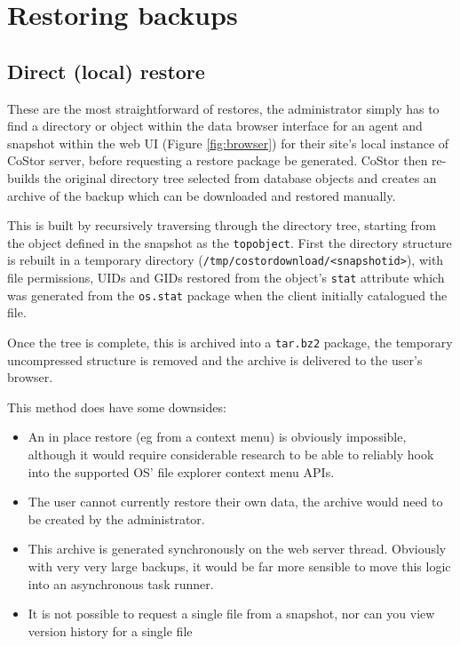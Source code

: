 \documentclass[bsc,frontabs,twoside,singlespacing,parskip,deptreport]{infthesis}     %
\begin{document}
\section{Restoring backups}
\label{sec:restoringbackups}

\subsection{Direct (local) restore}

These are the most straightforward of restores, the administrator simply has to find a directory
or object within the data browser interface  for an agent and snapshot within the web UI (Figure \ref{fig:browser}) for their 
site's local instance of CoStor server, before requesting a restore package be generated. CoStor 
then re-builds the original directory tree selected from database objects and creates an archive
of the backup which can be downloaded and restored manually.

This is built by recursively traversing through the directory tree, starting from the object defined in the 
snapshot as the \texttt{topobject}. First the directory structure is rebuilt in a temporary 
directory (\texttt{/tmp/costordownload/<snapshotid>}), with file permissions, UIDs and GIDs 
restored from the object's \texttt{stat} attribute which was generated from the \texttt{os.stat}
package when the client initially catalogued the file.

Once the tree is complete, this is archived into a \texttt{tar.bz2} package, the temporary 
uncompressed structure is removed and the archive is delivered to the user's browser.

This method does have some downsides:

\begin{itemize}
	\item An in place restore (eg from a context menu) is 
		obviously impossible, although it would require considerable research to be able to reliably
		hook into the supported OS' file explorer context menu APIs.
	\item The user cannot currently
		restore their own data, the archive would need to be created by the administrator.
	\item This archive is generated synchronously on the web server thread. Obviously with very
		very large backups, it would be far more sensible to move this logic into an asynchronous
		task runner.
	\item It is not possible to request a single file from a snapshot, nor can you view version
		history for a single file
\end{itemize}
\end{document}
